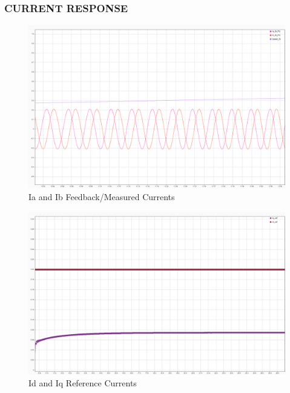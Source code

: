 \subsubsection{CURRENT RESPONSE}


\begin{figure}[H]
	\centering
	\includegraphics[width=6in]{sections/section3/images/simulationResutls/Ia_Ib_fb.png}
	\caption{Ia and Ib Feedback/Measured Currents}
\end{figure}


\begin{figure}[H]
	\centering
	\includegraphics[width=6in]{sections/section3/images/simulationResutls/Id_ref_Iq_ref.png}
	\caption{Id and Iq Reference Currents}
\end{figure}


